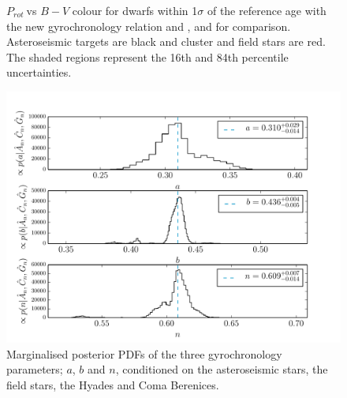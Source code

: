 \documentclass[11pt,preprint]{aastex}
\newcommand{\prot}{$P_{rot}~$}
\begin{document}
\begin{figure}[ht]
\begin{center}
{        }
    \end{center}
    \caption{ \prot vs $B-V$ colour for dwarfs within 1$\sigma$ of the reference age with the new gyrochronology relation and \citet{Barnes2007}, and \citet{Mamajek2008} for comparison. Asteroseismic targets are black and cluster and field stars are red. The shaded regions represent the 16th and 84th percentile uncertainties.
   \label{fig:subfigures2}}
\end{figure}

\begin{figure}[ht]
\begin{center}
\includegraphics[width=6in, clip=true, trim=0 0 0.5in 0]{marg_posteriors.pdf}
\caption{Marginalised posterior PDFs of the three gyrochronology parameters; $a$, $b$ and $n$, conditioned on the asteroseismic stars, the field stars, the Hyades and Coma Berenices.
\label{fig:marg_posteriors}}
\end{center}
\end{figure}
\end{document}
